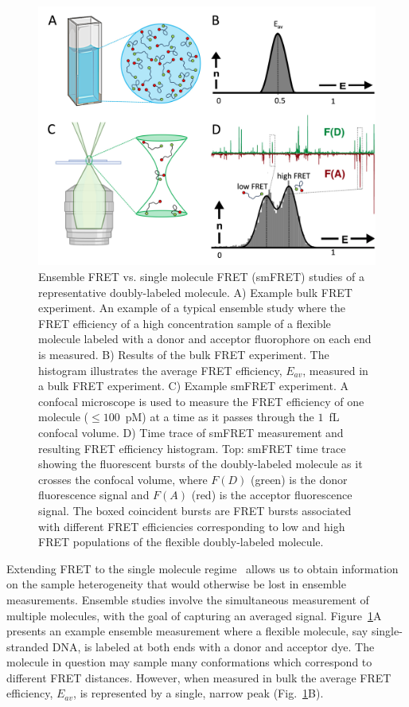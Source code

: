 \begin{figure}
    \centering
    \includegraphics[width=\textwidth]{chapters/figures/smFRET_vs_ensemble.jpg}
    \caption{\label{fig:smFRET_vs_ensemble} 
    Ensemble FRET vs. single molecule FRET (\ac{smFRET}) studies of a representative doubly-labeled molecule.
    A) Example bulk FRET experiment. 
    An example of a typical ensemble study where the FRET efficiency of a high concentration sample of a flexible molecule labeled with a donor and acceptor fluorophore on each end is measured.
    B) Results of the bulk FRET experiment.
    The histogram illustrates the average FRET efficiency, $E_{av}$, measured in a bulk FRET experiment. 
    C) Example smFRET experiment.
    A confocal microscope is used to measure the FRET efficiency of one molecule ($\leq 100$~pM) at a time as it passes through the $1$~fL confocal volume.
    D) Time trace of smFRET measurement and resulting FRET efficiency histogram.
    Top: smFRET time trace showing the fluorescent bursts of the doubly-labeled molecule as it crosses the confocal volume, where $F(D)$ (green) is the donor fluorescence signal and $F(A)$ (red) is the acceptor fluorescence signal.
    The boxed coincident bursts are FRET bursts associated with different FRET efficiencies corresponding to low and high FRET populations of the flexible doubly-labeled molecule.
    }
\end{figure}

Extending FRET to the single molecule regime~\cite{deniz_PNAS_1999} allows us to obtain information on the sample heterogeneity that would otherwise be lost in ensemble measurements. 
Ensemble studies involve the simultaneous measurement of multiple molecules, with the goal of capturing an averaged signal.
Figure~\ref{fig:smFRET_vs_ensemble}A presents an example ensemble measurement where a flexible molecule, say single-stranded DNA, is labeled at both ends with a donor and acceptor dye.
The molecule in question may sample many conformations which correspond to different FRET distances.
However, when measured in bulk the average FRET efficiency, $E_{av}$, is represented by a single, narrow peak (Fig.~\ref{fig:smFRET_vs_ensemble}B).

